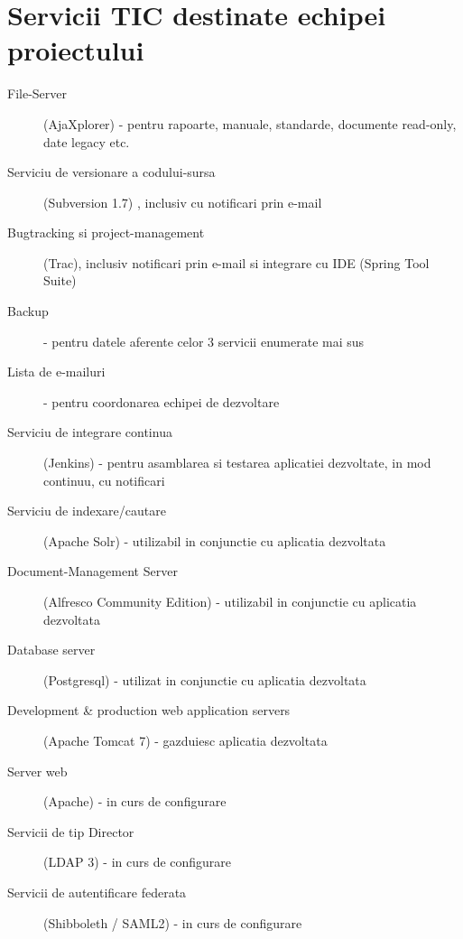\section{Servicii TIC destinate echipei proiectului}
\begin{description}

\item[File-Server] (AjaXplorer) - pentru rapoarte, manuale, standarde, documente read-only, date legacy etc.

\item[Serviciu de versionare a codului-sursa] (Subversion 1.7) , inclusiv
    cu notificari prin e-mail

\item[Bugtracking si project-management] (Trac), inclusiv notificari prin
    e-mail si integrare cu IDE (Spring Tool Suite)

\item[Backup] - pentru datele aferente celor 3 servicii enumerate mai sus

\item[Lista de e-mailuri] - pentru coordonarea echipei de dezvoltare

\item[Serviciu de integrare continua] (Jenkins) - pentru asamblarea si
    testarea aplicatiei dezvoltate, in mod continuu, cu notificari

\item[Serviciu de indexare/cautare] (Apache Solr) - utilizabil in
    conjunctie cu aplicatia dezvoltata

\item[Document-Management Server] (Alfresco Community Edition) -
    utilizabil in conjunctie cu aplicatia dezvoltata

\item[Database server] (Postgresql) - utilizat in conjunctie cu
    aplicatia dezvoltata

\item[Development \& production web application servers] (Apache Tomcat 7) -
    gazduiesc aplicatia dezvoltata

\item[Server web] (Apache) - in curs de configurare

\item[Servicii de tip Director] (LDAP 3) - in curs de configurare

\item[Servicii de autentificare federata] (Shibboleth / SAML2) - in curs de
configurare

\end{description}
